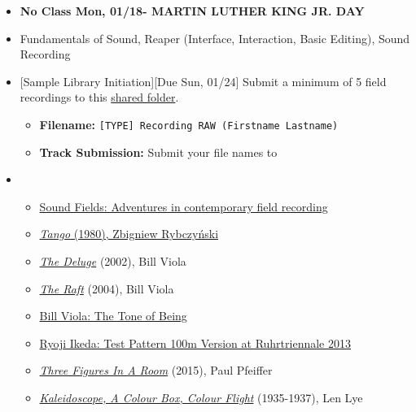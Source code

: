 \def\dMon{Mon, 01/18}
\def\dTues{Tues, 01/19}
\def\dWed{Wed, 01/20}
\def\dThur{Thur, 01/21}
\def\dFri{Fri, 01/22}
\def\dSat{Sat, 01/23}
\def\dSun{Sun, 01/24}
\placeDate

\begin{itemize}[noitemsep,topsep=0pt,leftmargin=*]
	\item \textcolor{defaultColor}{\textbf{No Class \dMon - MARTIN LUTHER KING JR. DAY}}

	\item {} Fundamentals of Sound, Reaper (Interface, Interaction, Basic Editing), Sound Recording
	\item {}[Sample Library Initiation][Due \dSun] \newline
	      Submit a minimum of 5 field recordings to this \href{\samplelibInitURL}{shared folder}.
	      \begin{itemize}
		      \item \textbf{Filename:} \texttt{[TYPE] Recording RAW (Firstname Lastname)}
		      \item \textbf{Track Submission:} Submit your file names to \discordE
	      \end{itemize}
	\item {}
	      \begin{itemize}
		      \item \href{https://www.youtube.com/watch?v=esfUwg1-xrI}{Sound Fields: Adventures in contemporary field recording}
		      \item \href{https://www.youtube.com/watch?v=u0pEpA_Y1a4}{\emph{Tango} (1980), Zbigniew Rybczyński}
		      \item \href{https://www.youtube.com/watch?v=t3VoMuwBPAE}{\emph{The Deluge}} (2002), Bill Viola
		      \item \href{https://www.youtube.com/watch?v=4Ili9pvlxdk}{\emph{The Raft}} (2004), Bill Viola
		      \item \href{https://vimeo.com/64302190}{Bill Viola: The Tone of Being}
		      \item \href{https://www.youtube.com/watch?v=XwjlYpJCBgk}{Ryoji Ikeda: Test Pattern 100m Version at Ruhrtriennale 2013}
		      \item \href{https://paul-pfeiffer.com/three-figures-in-a-room}{\emph{Three Figures In A Room}} (2015), Paul Pfeiffer
		      \item \href{https://www.youtube.com/watch?v=-DksmbDMDUU}{\emph{Kaleidoscope, A Colour Box, Colour Flight}} (1935-1937), Len Lye

\end{itemize}
\end{itemize}
